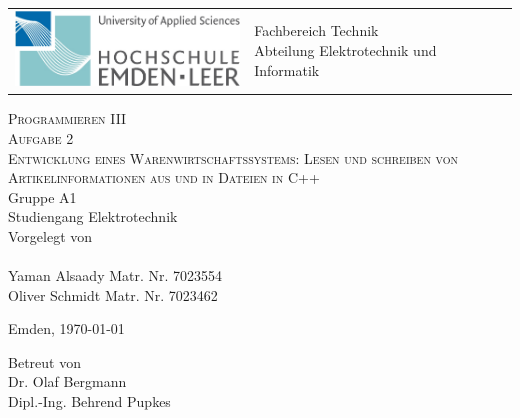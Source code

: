 \begin{titlepage}

\vspace{-0.5cm}
\hspace{-0.5cm}
\begin{tabular}{p{8.0cm} p{8.0cm}}
  \includegraphics[width = 6.0cm]{../tex/hsel-allgemein.png} &
   \parbox[b]{8.0cm}{
     {\large 	Fachbereich Technik }\\
     {\large 	Abteilung Elektrotechnik und Informatik }     
    } \\
   \\
   \hline
\end{tabular}
%
\begin{center}

\vspace{2.5cm}
\LARGE{\textsc{
    Programmieren III\\ Aufgabe 2
}}\\

\vspace{2.5cm}
\LARGE{\textsc{
{Entwicklung eines Warenwirtschaftssystems: Lesen und schreiben von Artikelinformationen aus und in Dateien in C++}
}}\\

\vspace{2cm}%
\large
Gruppe A1\\
Studiengang Elektrotechnik\\
Vorgelegt von\\\ \\
Yaman Alsaady\hspace{2cm} Matr. Nr. 7023554\\
Oliver Schmidt\hspace{2cm} Matr. Nr. 7023462


\vspace{1cm} 
Emden, \today

\vspace{3.5cm}%
Betreut von\\ Dr. Olaf Bergmann\\Dipl.-Ing. Behrend Pupkes

\end{center}
\normalsize
\end{titlepage}
